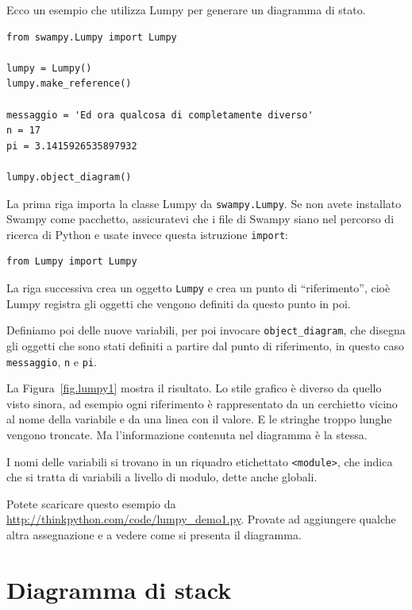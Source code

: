 \documentclass[10pt]{book}
\begin{document}
Ecco un esempio che utilizza Lumpy per generare un diagramma di stato.
 

\begin{verbatim}
from swampy.Lumpy import Lumpy

lumpy = Lumpy()
lumpy.make_reference()

messaggio = 'Ed ora qualcosa di completamente diverso'
n = 17
pi = 3.1415926535897932

lumpy.object_diagram()
\end{verbatim}

La prima riga importa la classe Lumpy da {\tt swampy.Lumpy}.
Se non avete installato Swampy come pacchetto, assicuratevi che i file di Swampy siano nel percorso di ricerca di Python e usate invece questa istruzione
{\tt import}:

\begin{verbatim}
from Lumpy import Lumpy
\end{verbatim}

La riga successiva crea un oggetto {\tt Lumpy} e crea un punto di ``riferimento'', cioè Lumpy registra gli oggetti che vengono definiti da questo punto in poi.

Definiamo poi delle nuove variabili, per poi invocare \verb"object_diagram",
che disegna gli oggetti che sono stati definiti a partire dal punto di riferimento, in questo caso {\tt messaggio}, {\tt n} e {\tt pi}.

La Figura~\ref{fig.lumpy1} mostra il risultato. Lo stile grafico è diverso da quello visto sinora, ad esempio ogni riferimento è rappresentato da un cerchietto vicino al nome della variabile e da una linea con il valore. E le stringhe troppo lunghe vengono troncate. Ma l'informazione contenuta nel diagramma è la stessa.

I nomi delle variabili si trovano in un riquadro etichettato \verb"<module>", che indica che si tratta di variabili a livello di modulo, dette anche globali.

Potete scaricare questo esempio da
\url{http://thinkpython.com/code/lumpy_demo1.py}.  Provate ad aggiungere qualche altra assegnazione e a vedere come si presenta il diagramma.


\section{Diagramma di stack}
\end{document}
